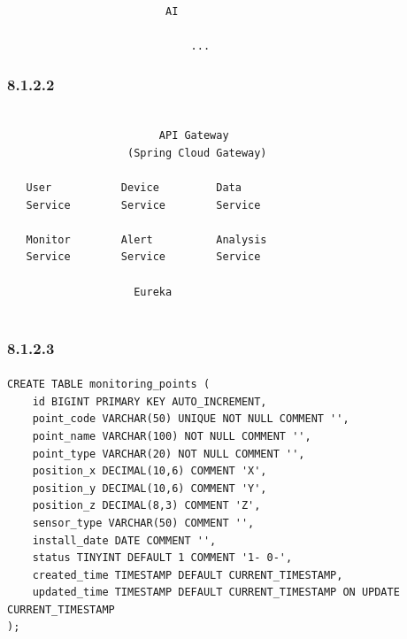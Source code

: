 \begin{lstlisting}

                         AI        

                             ...

\end{lstlisting}

\hypertarget{section-39}{%
\subsubsection{8.1.2.2}\label{section-39}}

\begin{lstlisting}

                        API Gateway                         
                   (Spring Cloud Gateway)                   

   User           Device         Data       
   Service        Service        Service    

   Monitor        Alert          Analysis   
   Service        Service        Service    

                    Eureka     
                    
\end{lstlisting}

\hypertarget{section-40}{%
\subsubsection{8.1.2.3}\label{section-40}}

\hypertarget{section-41}{%
\paragraph{}\label{section-41}}

\begin{lstlisting}[style=sql]
CREATE TABLE monitoring_points (
    id BIGINT PRIMARY KEY AUTO_INCREMENT,
    point_code VARCHAR(50) UNIQUE NOT NULL COMMENT '',
    point_name VARCHAR(100) NOT NULL COMMENT '',
    point_type VARCHAR(20) NOT NULL COMMENT '',
    position_x DECIMAL(10,6) COMMENT 'X',
    position_y DECIMAL(10,6) COMMENT 'Y',
    position_z DECIMAL(8,3) COMMENT 'Z',
    sensor_type VARCHAR(50) COMMENT '',
    install_date DATE COMMENT '',
    status TINYINT DEFAULT 1 COMMENT '1- 0-',
    created_time TIMESTAMP DEFAULT CURRENT_TIMESTAMP,
    updated_time TIMESTAMP DEFAULT CURRENT_TIMESTAMP ON UPDATE CURRENT_TIMESTAMP
);
\end{lstlisting}

